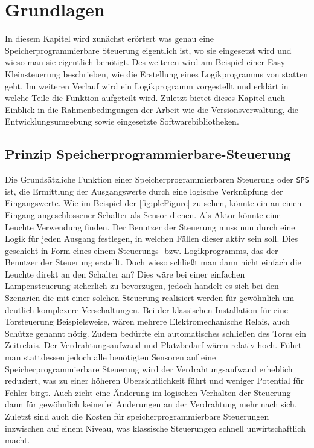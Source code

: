 \section{Grundlagen}\label{kap:grund}
In diesem Kapitel wird zunächst erörtert was genau eine Speicherprogrammierbare Steuerung eigentlich ist, wo sie eingesetzt wird und wieso man sie eigentlich benötigt. Des weiteren wird am Beispiel einer Easy Kleinsteuerung beschrieben, wie die Erstellung eines Logikprogramms von statten geht. Im weiteren Verlauf wird ein Logikprogramm vorgestellt und erklärt in welche Teile die Funktion aufgeteilt wird. Zuletzt bietet dieses Kapitel auch Einblick in die Rahmenbedingungen der Arbeit wie die Versionsverwaltung, die Entwicklungsumgebung sowie eingesetzte Softwarebibliotheken. 
\subsection{Prinzip Speicherprogrammierbare-Steuerung}
Die Grundsätzliche Funktion einer Speicherprogrammierbaren Steuerung oder \texttt{SPS} \cite{BOOK:SPS} ist, die Ermittlung der Ausgangswerte durch eine logische Verknüpfung der Eingangswerte. Wie im Beispiel der \autoref{fig:plcFigure} zu sehen, könnte ein an einen Eingang angeschlossener Schalter als Sensor dienen. Als Aktor könnte eine Leuchte Verwendung finden. Der Benutzer der Steuerung muss nun durch eine Logik für jeden Ausgang festlegen, in welchen Fällen dieser aktiv sein soll. Dies geschieht in Form eines einem Steuerungs- bzw. Logikprogramms, das der Benutzer der Steuerung erstellt. Doch wieso schließt man dann nicht einfach die Leuchte direkt an den Schalter an? Dies wäre bei einer einfachen Lampensteuerung sicherlich zu bevorzugen, jedoch handelt es sich bei den Szenarien die mit einer solchen Steuerung realisiert werden für gewöhnlich um deutlich komplexere Verschaltungen. Bei der klassischen Installation für eine Torsteuerung Beispielsweise, wären mehrere Elektromechanische Relais, auch Schütze genannt nötig. Zudem bedürfte ein automatisches schließen des Tores ein Zeitrelais. Der Verdrahtungsaufwand und Platzbedarf wären relativ hoch. Führt man stattdessen jedoch alle benötigten Sensoren auf eine Speicherprogrammierbare Steuerung wird der Verdrahtungsaufwand erheblich reduziert, was zu einer höheren Übersichtlichkeit führt und weniger Potential für Fehler birgt. Auch zieht eine Änderung im logischen Verhalten der Steuerung dann für gewöhnlich keinerlei Änderungen an der Verdrahtung mehr nach sich. Zuletzt sind auch die Kosten für speicherprogrammierbare Steuerungen inzwischen auf einem Niveau, was klassische Steuerungen schnell unwirtschaftlich macht. 

